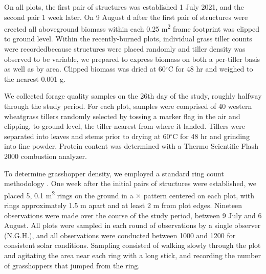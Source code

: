 \documentclass[referee, 
	            sn-basic]
           {sn-jnl}
\begin{document}
On all plots, the first pair of structures was established 1 July 2021, and the second pair 1 week later. 
On 9 August d after the first pair of structures were erected\textemdash 
all aboveground biomass within each 0.25 m\textsuperscript{2} frame footprint was clipped to ground level.
Within the recently-burned plots, individual grass tiller counts were recorded\textemdash because structures were placed randomly and tiller density was observed to be variable, we prepared to express biomass on both a per-tiller basis as well as by area. 
Clipped biomass was dried at 60$^\circ$C for 48 hr and weighed to the nearest 0.001 g. 


We collected forage quality samples on the 26th day of the study, roughly halfway through the study period.
For each plot, samples were comprised of 40 western wheatgrass tillers randomly selected by tossing a marker flag in the air and clipping, to ground level, the tiller nearest from where it landed. 
Tillers were  separated into leaves and stems prior to drying at 60$^\circ$C for 48 hr and grinding into fine powder. 
Protein content was determined with a Thermo Scientific Flash 2000 combustion analyzer. 

To determine grasshopper density, we employed a standard ring count methodology
\citep{onsager1977, joern2013}. 
One week after the initial pairs of structures were established, we placed 5, 0.1 m\textsuperscript{2} rings on the ground in a {\large{$\times$}} pattern centered on each plot, with rings approximately 1.5 m apart and at least 2 m from plot edges.
Nineteen observations were made over the course of the study period, between 9 July and 6 August. 
All plots were sampled in each round of observations by a single observer (N.G.H.), and all observations were conducted between 1000 and 1200 for consistent solar conditions. 
Sampling consisted of walking slowly through the plot and agitating the area near each ring with a long stick, and recording the number of grasshoppers that jumped from the ring.
\end{document}
